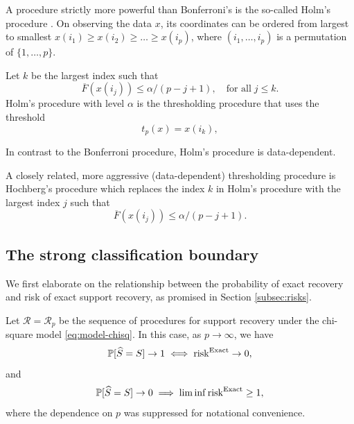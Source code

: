 A procedure strictly more powerful than Bonferroni's is the so-called Holm's procedure \citep{holm1979simple}.
On observing the data $x$, its coordinates can be ordered from largest to smallest
$x(i_1) \ge x(i_2)  \ge \ldots \ge x(i_p)$,
where $(i_1, \ldots, i_p)$ is a permutation of $\{1, \ldots, p\}$. 
\begin{definition}
Let $k$ be the largest index such that
$$
\overline{F}(x(i_j)) \le \alpha / (p-j+1),\quad \text{for all}\;j\le k.
$$
Holm's procedure with level $\alpha$ is the thresholding procedure that uses the threshold
\begin{equation} \label{eq:Holm-procedure}
    t_p(x) = x(i_{k}),
\end{equation}
\end{definition}
In contrast to the Bonferroni procedure, Holm's procedure is data-dependent.

A closely related, more aggressive (data-dependent) thresholding procedure is Hochberg's procedure \citep{hochberg1988sharper}
which replaces the index $k$ in Holm's procedure with the largest index $j$ such that
$$
\overline{F}(x(i_j)) \le \alpha / (p-j+1).
$$

\subsection{The strong classification boundary}
\label{subsec:strong-classification-boundary}

We first elaborate on the relationship between the probability of exact recovery and risk of exact support recovery, as promised in Section \ref{subsec:risks}.
\begin{lemma} \label{lemma:risk-exact-recovery-probability}
Let $\mathcal{R} = \mathcal{R}_p$ be the sequence of procedures for support recovery under the chi-square model \eqref{eq:model-chisq}. 
In this case, as $p\to\infty$, we have
\begin{equation} \label{eq:exact-recovery-implies-risk-0}
    \P[\widehat{S} = S] \to 1 \iff \mathrm{risk}^{\mathrm{Exact}}\to0,
\end{equation}
and
\begin{equation} \label{eq:failure-recovery-implies-risk-1}
    \P[\widehat{S} = S] \to 0 \implies \liminf\mathrm{risk}^{\mathrm{Exact}}\ge1,
\end{equation}
where the dependence on $p$ was suppressed for notational convenience.
\end{lemma}

